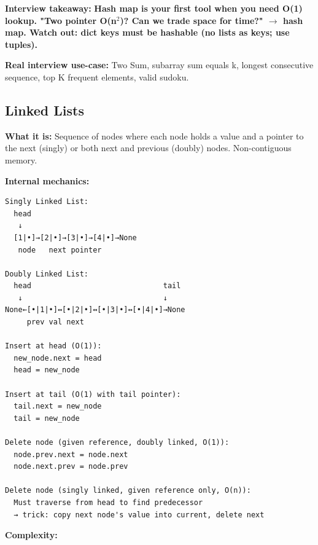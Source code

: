 \documentclass[11pt]{article}
\begin{document}
\textbf{Interview takeaway:} \textbf{Hash map is your first tool when you need O(1) lookup. "Two pointer O(n\(^2\))? Can we trade space for time?" \(\rightarrow\) hash map. Watch out: dict keys must be hashable (no lists as keys; use tuples).}

\textbf{Real interview use-case:} Two Sum, subarray sum equals k, longest consecutive sequence, top K frequent elements, valid sudoku.

\subsection{Linked Lists}\label{linked-lists}

\textbf{What it is:} Sequence of nodes where each node holds a value and a pointer to the next (singly) or both next and previous (doubly) nodes. Non-contiguous memory.

\textbf{Internal mechanics:}

\setcodelang{}

\begin{verbatim}
Singly Linked List:
  head
   ↓
  [1|•]→[2|•]→[3|•]→[4|•]→None
   node   next pointer

Doubly Linked List:
  head                              tail
   ↓                                ↓
None←[•|1|•]↔[•|2|•]↔[•|3|•]↔[•|4|•]→None
     prev val next

Insert at head (O(1)):
  new_node.next = head
  head = new_node

Insert at tail (O(1) with tail pointer):
  tail.next = new_node
  tail = new_node

Delete node (given reference, doubly linked, O(1)):
  node.prev.next = node.next
  node.next.prev = node.prev

Delete node (singly linked, given reference only, O(n)):
  Must traverse from head to find predecessor
  → trick: copy next node's value into current, delete next
\end{verbatim}

\textbf{Complexity:}
\end{document}
